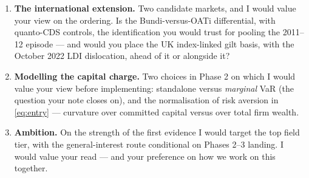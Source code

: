 \documentclass[11pt]{article}
\begin{document}
\begin{enumerate}
\item \textbf{The international extension.} Two candidate markets, and I would value your view on the ordering. Is the Bund\texteuro i-versus-OAT\texteuro i differential, with quanto-CDS controls, the identification you would trust for pooling the 2011--12 episode --- and would you place the UK index-linked gilt basis, with the October 2022 LDI dislocation, ahead of it or alongside it?
\item \textbf{Modelling the capital charge.} Two choices in Phase 2 on which I would value your view before implementing: standalone versus \emph{marginal} VaR (the question your note closes on), and the normalisation of risk aversion in \eqref{eq:entry} --- curvature over committed capital versus over total firm wealth.
\item \textbf{Ambition.} On the strength of the first evidence I would target the top field tier, with the general-interest route conditional on Phases 2--3 landing. I would value your read --- and your preference on how we work on this together.
\end{enumerate}
\end{document}
